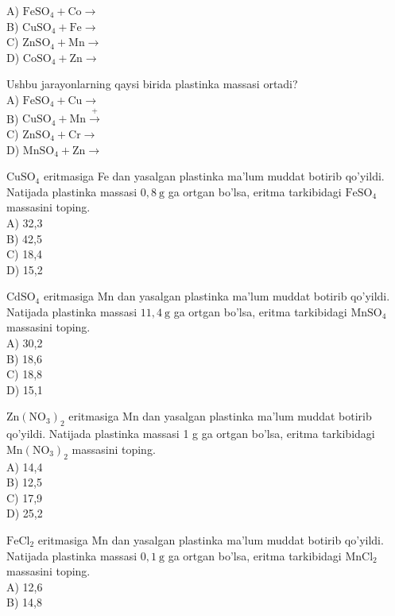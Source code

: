 A) $\mathrm{FeSO}_{4}+\mathrm{Co} \rightarrow$\\
B) $\mathrm{CuSO}_{4}+\mathrm{Fe} \rightarrow$\\
C) $\mathrm{ZnSO}_{4}+\mathrm{Mn} \rightarrow$\\
D) $\mathrm{CoSO}_{4}+\mathrm{Zn} \rightarrow$
  \item Ushbu jarayonlarning qaysi birida plastinka massasi ortadi?\\
A) $\mathrm{FeSO}_{4}+\mathrm{Cu} \rightarrow$\\
B) $\mathrm{CuSO}_{4}+\mathrm{Mn} \xrightarrow{+}$\\
C) $\mathrm{ZnSO}_{4}+\mathrm{Cr} \rightarrow$\\
D) $\mathrm{MnSO}_{4}+\mathrm{Zn} \rightarrow$
  \item $\mathrm{CuSO}_{4}$ eritmasiga Fe dan yasalgan plastinka ma'lum muddat botirib qo'yildi. Natijada plastinka massasi $0,8 \mathrm{~g}$ ga ortgan bo'lsa, eritma tarkibidagi $\mathrm{FeSO}_{4}$ massasini toping.\\
A) 32,3\\
B) 42,5\\
C) 18,4\\
D) 15,2
  \item $\mathrm{CdSO}_{4}$ eritmasiga Mn dan yasalgan plastinka ma'lum muddat botirib qo'yildi. Natijada plastinka massasi $11,4 \mathrm{~g}$ ga ortgan bo'lsa, eritma tarkibidagi $\mathrm{MnSO}_{4}$ massasini toping.\\
A) 30,2\\
B) 18,6\\
C) 18,8\\
D) 15,1
  \item $\mathrm{Zn}\left(\mathrm{NO}_{3}\right)_{2}$ eritmasiga Mn dan yasalgan plastinka ma'lum muddat botirib qo'yildi. Natijada plastinka massasi 1 g ga ortgan bo'lsa, eritma tarkibidagi $\mathrm{Mn}\left(\mathrm{NO}_{3}\right)_{2}$ massasini toping.\\
A) 14,4\\
B) 12,5\\
C) 17,9\\
D) 25,2
  \item $\mathrm{FeCl}_{2}$ eritmasiga Mn dan yasalgan plastinka ma'lum muddat botirib qo'yildi.\\
Natijada plastinka massasi $0,1 \mathrm{~g}$ ga ortgan bo'lsa, eritma tarkibidagi $\mathrm{MnCl}_{2}$ massasini toping.\\
A) 12,6\\
B) 14,8\\
